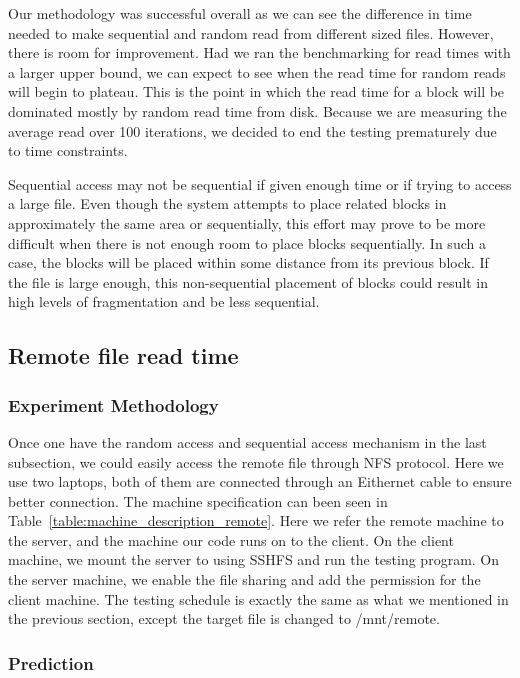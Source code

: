 \documentclass{article} %
\begin{document}
Our methodology was successful overall as we can see the difference in time needed to make sequential and random read from different sized files. However, there is room for improvement. Had we ran the benchmarking for read times with a larger upper bound, we can expect to see when the read time for random reads will begin to plateau. This is the point in which the read time for a block will be dominated mostly by random read time from disk. Because we are measuring the average read over 100 iterations, we decided to end the testing prematurely due to time constraints.

Sequential access may not be sequential if given enough time or if trying to access a large file. Even though the system attempts to place related blocks in approximately the same area or sequentially, this effort may prove to be more difficult when there is not enough room to place blocks sequentially. In such a case, the blocks will be placed within some distance from its previous block. If the file is large enough, this non-sequential placement of blocks could result in high levels of fragmentation and be less sequential.

\subsection{Remote file read time}

\subsubsection{Experiment Methodology}
Once one have the random access and sequential access mechanism in the last subsection, we could
easily access the remote file through NFS protocol. Here we use two laptops, both of them are connected through an Eithernet cable to ensure better connection. The machine specification can been seen in Table~\ref{table:machine_description_remote}. Here we refer the remote machine to the server, and the machine our code runs on to the client.
On the client machine, we mount the server to using SSHFS and run the testing program.
On the server machine,  we enable the file sharing and add the permission for the client machine.
The testing schedule is exactly the same as what we mentioned in the previous section, except the target file is changed to /mnt/remote.

\subsubsection{Prediction}
\end{document}

